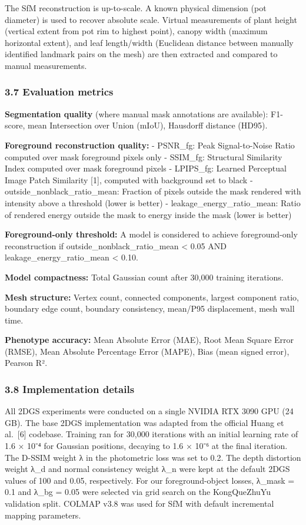 \documentclass[11pt,a4paper]{article}
\begin{document}
The SfM reconstruction is up-to-scale. A known physical dimension (pot
diameter) is used to recover absolute scale. Virtual measurements of
plant height (vertical extent from pot rim to highest point), canopy
width (maximum horizontal extent), and leaf length/width (Euclidean
distance between manually identified landmark pairs on the mesh) are
then extracted and compared to manual measurements.

\subsubsection{3.7 Evaluation metrics}\label{evaluation-metrics}

\textbf{Segmentation quality} (where manual mask annotations are
available): F1-score, mean Intersection over Union (mIoU), Hausdorff
distance (HD95).

\textbf{Foreground reconstruction quality:} - PSNR\_fg: Peak
Signal-to-Noise Ratio computed over mask foreground pixels only -
SSIM\_fg: Structural Similarity Index computed over mask foreground
pixels - LPIPS\_fg: Learned Perceptual Image Patch Similarity {[}1{]},
computed with background set to black - outside\_nonblack\_ratio\_mean:
Fraction of pixels outside the mask rendered with intensity above a
threshold (lower is better) - leakage\_energy\_ratio\_mean: Ratio of
rendered energy outside the mask to energy inside the mask (lower is
better)

\textbf{Foreground-only threshold:} A model is considered to achieve
foreground-only reconstruction if outside\_nonblack\_ratio\_mean
\textless{} 0.05 AND leakage\_energy\_ratio\_mean \textless{} 0.10.

\textbf{Model compactness:} Total Gaussian count after 30,000 training
iterations.

\textbf{Mesh structure:} Vertex count, connected components, largest
component ratio, boundary edge count, boundary consistency, mean/P95
displacement, mesh wall time.

\textbf{Phenotype accuracy:} Mean Absolute Error (MAE), Root Mean Square
Error (RMSE), Mean Absolute Percentage Error (MAPE), Bias (mean signed
error), Pearson R².

\subsubsection{3.8 Implementation details}\label{implementation-details}

All 2DGS experiments were conducted on a single NVIDIA RTX 3090 GPU (24
GB). The base 2DGS implementation was adapted from the official Huang et
al.~{[}6{]} codebase. Training ran for 30,000 iterations with an initial
learning rate of 1.6 × 10⁻⁴ for Gaussian positions, decaying to 1.6 ×
10⁻⁶ at the final iteration. The D-SSIM weight λ in the photometric loss
was set to 0.2. The depth distortion weight λ\_d and normal consistency
weight λ\_n were kept at the default 2DGS values of 100 and 0.05,
respectively. For our foreground-object losses, λ\_mask = 0.1 and λ\_bg
= 0.05 were selected via grid search on the KongQueZhuYu validation
split. COLMAP v3.8 was used for SfM with default incremental mapping
parameters.
\end{document}
